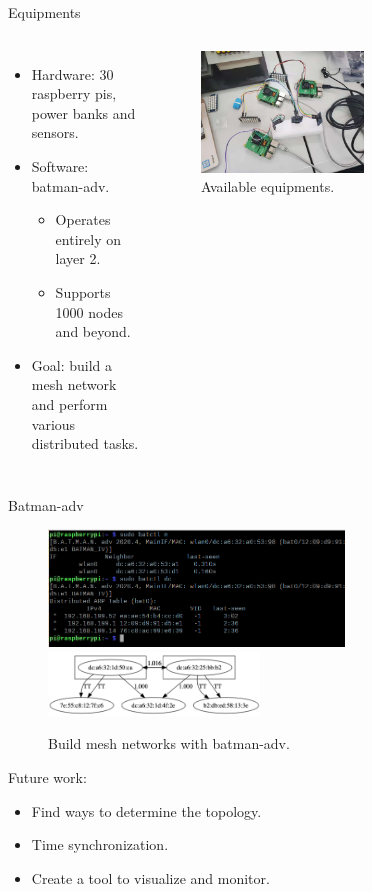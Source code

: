 \documentclass[10pt]{beamer}
\DeclareMathOperator{\1}{\textbf{1}}
\begin{document}
	      \begin{frame}{Equipments}
		\begin{columns}[c]
		  \column{6cm}
		  \begin{itemize}
		    \item Hardware: 30 raspberry pis, power banks and sensors.
		    \item Software: batman-adv.
		      \begin{itemize}
			\item Operates entirely on layer 2.
			\item Supports 1000 nodes and beyond.
		      \end{itemize}
		    \item Goal: build a mesh network and perform various distributed tasks.
		  \end{itemize}
		  \column{6cm}
		  \begin{figure}
		    \centering
		    \includegraphics[width=0.6\textwidth,angle=90]{pic/rapberry_pi.jpg}
		    \caption{Available equipments.}
		  \end{figure}
		\end{columns}
	      \end{frame}

	      \begin{frame}{Batman-adv}
		\begin{figure}
		  \centering
		  \includegraphics[width=0.7\textwidth]{pic/batman-adv.png}
		  \includegraphics[width=0.5\textwidth]{pic/batman-topology.png}
		  \caption{Build mesh networks with batman-adv.}
		\end{figure}
		Future work:
		\begin{itemize}
		  \item Find ways to determine the topology.
		  \item Time synchronization.
		  \item Create a tool to visualize and monitor.
		\end{itemize}
	      \end{frame}
\end{document}
